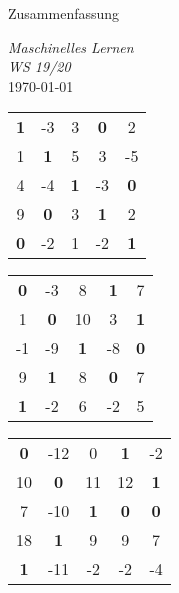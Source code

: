 \documentclass{report}
\begin{document}
\begin{center}
    \large Zusammenfassung
\end{center}

\begin{center}
    \Large \textit{Maschinelles Lernen}\\
    \vspace*{.5em}
    \normalsize \textit{WS 19/20}\\
    \vspace*{45em}
    \large \today
\end{center}

\newpage

\begin{tabular}{ccccc|}
 \textbf{1} & -3 & 3 & \textbf{0} & 2\\
  1 & \textbf{1} & 5 & 3 & -5\\
  4 & -4 & \textbf{1} & -3 & \textbf{0}\\
  9 & \textbf{0} & 3 & \textbf{1} & 2\\
  \textbf{0} & -2 & 1 & -2 & \textbf{1}\\
  \hline
\end{tabular}

\vspace*{1em}

\begin{tabular}{ccccc|}
  \textbf{0} & -3 & 8 & \textbf{1} & 7\\
   1 & \textbf{0} & 10 & 3 & \textbf{1}\\
   -1 & -9 & \textbf{1} & -8 & \textbf{0}\\
   9 & \textbf{1} & 8 & \textbf{0} & 7\\
   \textbf{1} & -2 & 6 & -2 & 5\\
   \hline
 \end{tabular}

 \vspace*{1em}

\begin{tabular}{ccccc|}
  \textbf{0} & -12 & 0 & \textbf{1} & -2\\
   10 & \textbf{0} & 11 & 12 & \textbf{1}\\
   7 & -10 & \textbf{1} & \textbf{0} & \textbf{0}\\
   18 & \textbf{1} & 9 & 9 & 7\\
   \textbf{1} & -11 & -2 & -2 & -4\\
   \hline
 \end{tabular}

 \vspace*{1em}
\end{document}
